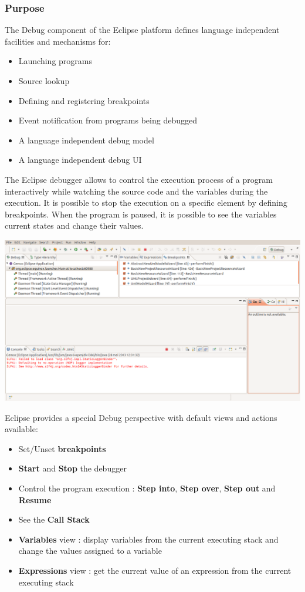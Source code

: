 \documentclass{gemoc} %
\begin{document}
\subsubsection{Purpose}
The Debug component of the Eclipse platform defines language independent facilities and mechanisms for:
\begin{itemize}
\item Launching programs
\item Source lookup
\item Defining and registering breakpoints
\item Event notification from programs being debugged
\item A language independent debug model
\item A language independent debug UI
\end{itemize}

The Eclipse debugger allows to control the execution process of a program interactively while watching the source code and the variables during the execution. It is possible to stop the execution on a specific element by defining breakpoints. When the program is paused, it is possible to see the variables current states and change their values.

\begin{center}
\includegraphics*[trim=0.0cm 0.0cm 0cm 0.0cm, clip=true, width=1.0\linewidth]{../images/EclipseDebugPerspective.png}
\end{center}

Eclipse provides a special Debug perspective with default views and actions available:
\begin{itemize}
\item Set/Unset \textbf{breakpoints}
\item \textbf{Start} and \textbf{Stop} the debugger
\item Control the program execution : \textbf{Step into}, \textbf{Step over}, \textbf{Step out} and \textbf{Resume}
\item See the \textbf{Call Stack}
\item \textbf{Variables} view : display variables from the current executing stack and change the values assigned to a variable
\item \textbf{Expressions} view : get the current value of an expression from the current executing stack
\end{itemize}
\end{document}
